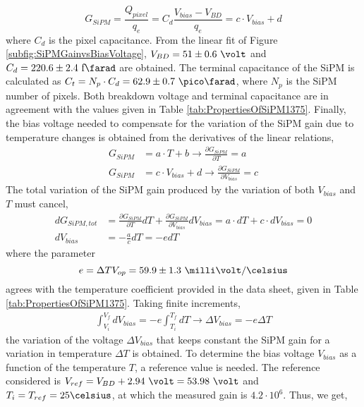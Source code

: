 \begin{equation}
G_{SiPM}=\frac{Q_{pixel}}{q_e} = C_d \frac{V_{bias}-V_{BD}}{q_e} = c \cdot{} V_{bias}+d
\label{SiPMGain_Capacitance}
\end{equation}
where $C_d$ is the pixel capacitance. From the linear fit of Figure \ref{subfig:SiPMGainvsBiasVoltage}, $V_{BD}=51 \pm 0.6~\volt$ and $C_d{}= 220.6 \pm 2.4~\text{f}\farad$ are obtained. The terminal capacitance of the SiPM is calculated as $C_{t}=N_{p} \cdot{} C_{d}=62.9 \pm 0.7~\pico\farad$, where $N_{p}$ is the SiPM number of pixels. Both breakdown voltage and terminal capacitance are in agreement with the values given in Table \ref{tab:PropertiesOfSiPM1375}. Finally, the bias voltage needed to compensate for the variation of the SiPM gain due to temperature changes is obtained from the derivatives of the linear relations,
\begin{equation*}
\begin{split}
G_{SiPM}&=a \cdot{} T + b  \longrightarrow \frac{\partial G_{SiPM}}{\partial T}= a \\
G_{SiPM}&=c \cdot{} V_{bias} + d \longrightarrow \frac{\partial G_{SiPM}}{\partial V_{bias}} = c
\label{Gain_compensationVariations}
\end{split}
\end{equation*} 
The total variation of the SiPM gain produced by the variation of both $V_{bias}$ and $T$ must cancel,
\begin{equation*}
\begin{split}
d G_{SiPM, tot}&= \frac{\partial G_{SiPM}}{\partial T} dT + \frac{\partial G_{SiPM}}{\partial V_{bias}} dV_{bias} = a \cdot{} dT + c \cdot{} dV_{bias} = 0\\ 
dV_{bias}  &= - \frac{a}{c} dT = - e dT
\label{Gain_compensation0}
\end{split}
\end{equation*} 
where the parameter $$e = \Delta T V_{op} = 59.9 \pm 1.3~\milli\volt/\celsius $$ agrees with the temperature coefficient provided in the data sheet, given in Table \ref{tab:PropertiesOfSiPM1375}. Taking finite increments,
\begin{equation}
\begin{split}
\int_{V_i}^{V_f} dV_{bias}  = -e\int_{T_i}^{T_f} dT \longrightarrow \Delta V_{bias} = -e \Delta T
\label{Gain_compensationIntegring}
\end{split}
\end{equation} 
the variation of the voltage $\Delta V_{bias}$ that keeps constant the SiPM gain for a variation in temperature $\Delta T$ is obtained. To determine the bias voltage $V_{bias}$ as a function of the temperature $T$, a reference value is needed. The reference considered is $V_{ref}= V_{BD}+2.94~\volt = 53.98~\volt$ and $T_i=T_{ref}=25\celsius$, at which the measured gain is $4.2 \cdot{} 10^{6}$. Thus, we get,
